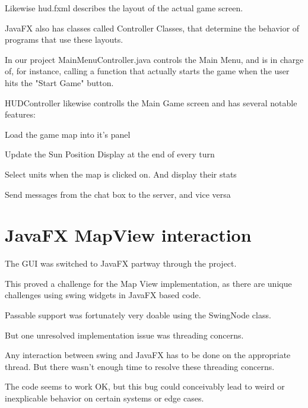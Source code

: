 \documentclass[12pt,a4paper]{article}
\begin{document}
Likewise hud.fxml describes the layout of the actual game screen.

JavaFX also has classes called Controller Classes, that determine the behavior
of programs that use these layouts.

In our project MainMenuController.java controls the Main Menu, and is in charge
of, for instance, calling a function that actually starts the game when the
user hits the "Start Game" button.

HUDController likewise controlls the Main Game screen and has several notable
features:

\begin{itemize}
\begin{item} Load the game map into it's panel \end{item}
\begin{item} Update the Sun Position Display at the end of every turn \end{item}
\begin{item} Select units when the map is clicked on. And display their stats
\end{item}
\begin{item} Send messages from the chat box to the server, and vice versa
\end{item}
\end{itemize}

\section{JavaFX MapView interaction}
The GUI was switched to JavaFX partway through the project.

This proved a challenge for the Map View implementation, as there are unique
challenges using swing widgets in JavaFX based code.

Passable support was fortunately very doable using the SwingNode class.

But one unresolved implementation issue was threading concerns.

Any interaction between swing and JavaFX has to be done on the appropriate
thread. But there wasn't enough time to resolve these threading concerns.

The code seems to work OK, but this bug could conceivably lead to weird
or inexplicable behavior on certain systems or edge cases.
\end{document}

